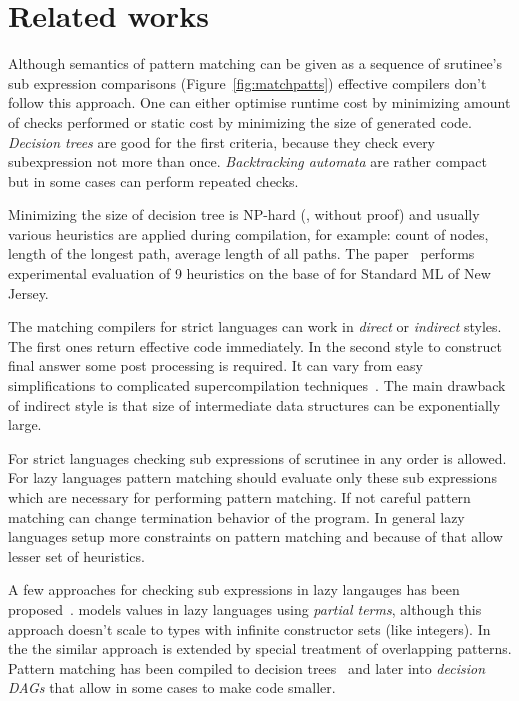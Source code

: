 \section{Related works}
\label{sec:related}

Although semantics of pattern matching can be given as a sequence of srutinee's sub expression comparisons (Figure~\ref{fig:matchpatts}) effective compilers don't follow this approach. One can either optimise runtime cost by minimizing amount of checks performed or static cost by minimizing the size of generated code. \emph{Decision trees} are good for the first criteria, because they check every subexpression not more than once. \emph{Backtracking automata} are rather compact but in some cases can perform repeated checks.


Minimizing the size of decision tree is  NP-hard (\cite{baudinet1985tree}, without proof) and usually various heuristics are applied during compilation, for example: count of nodes, length of the longest path, average length of all paths. The paper~\cite{Scott2000WhenDM} performs experimental evaluation of 9  heuristics on the base of for Standard ML of New Jersey.


The matching compilers for strict languages can work in \emph{direct} or \emph{indirect} styles. The first ones return effective code immediately. In the second style to construct final answer some post processing is required. It can vary from easy simplifications to complicated supercompilation techniques~\cite{sestoft1996}. The main drawback of indirect style is that size of intermediate data structures can be exponentially large.

For strict languages checking  sub expressions of scrutinee in any order is allowed. For lazy languages pattern matching should evaluate only these sub expressions which are necessary for performing pattern matching. If not careful pattern matching can change termination behavior of the program.  In general lazy languages setup more constraints on pattern matching and because of that allow lesser set of heuristics.

A few approaches for checking sub expressions in lazy langauges has been proposed~\cite{augustsson1985,laville1991}. \cite{laville1991} models values in lazy languages using \emph{partial terms}, although this approach doesn't scale to types with infinite constructor sets (like integers). In  the \cite{suarez1993} the similar approach is extended by special treatment of overlapping patterns. Pattern matching has been compiled to decision trees~\cite{maranget1992} and later \cite{maranget1992} into \emph{decision DAGs} that allow in some cases to make code smaller.

